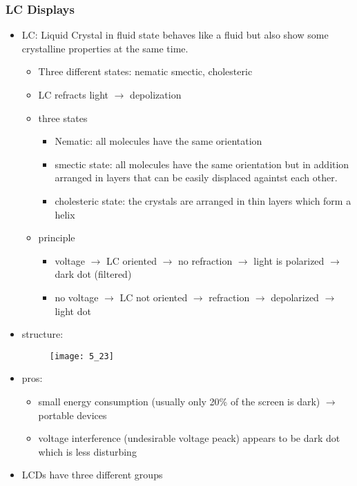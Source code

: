 \documentclass{standalone}
\begin{document}
\subsubsection*{LC Displays}
\begin{itemize}
\item LC: Liquid Crystal in fluid state behaves like a fluid but also show some crystalline properties at the same time.
	\begin{itemize}
		\item Three different states: nematic smectic, cholesteric
		\item LC refracts light $\rightarrow$ depolization
		\item three states
			\begin{itemize}
				\item Nematic: all molecules have the same orientation
				\item smectic state: all molecules have the same orientation but in addition arranged in layers that can be easily displaced againtst each other.
				\item cholesteric state: the crystals are arranged in thin layers which form a helix
			\end{itemize}
	\end{itemize}
\begin{itemize}
\item principle
	\begin{itemize}
		\item voltage $\rightarrow$ LC oriented $\rightarrow$ no refraction $\rightarrow$ light is polarized $\rightarrow$ dark dot (filtered)
		\item no voltage $\rightarrow$ LC not oriented $\rightarrow$ refraction $\rightarrow$ depolarized $\rightarrow$ light dot
	\end{itemize}
\end{itemize}
\item structure:
	\begin{figure}[H]
		\texttt{[image: 5\_23]}
	\end{figure}
\item pros:
	\begin{itemize}
		\item small energy consumption (usually only 20\% of the screen is dark) $\rightarrow$ portable devices
		\item voltage interference (undesirable voltage peack) appears to be dark dot which is less disturbing
	\end{itemize}
\item LCDs have three different groups

\end{itemize}
\end{document}
